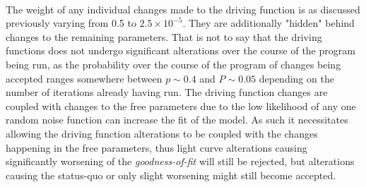 \documentclass[a4paper, 12pt, twoside]{article}
\begin{document}
\\
The weight of any individual changes made to the driving function is as discussed previously varying from 0.5 to $2.5 \times 10^{-5}$. They are additionally "hidden" behind changes to the remaining parameters. That is not to say that the driving functions does not undergo significant alterations over the course of the program being run, as the probability over the course of the program of changes being accepted ranges somewhere between $p\sim 0.4$ and $P\sim 0.05$ depending on the number of iterations already having run. The driving function changes are coupled with changes to the free parameters due to the low likelihood of any one random noise function can increase the fit of the model. As such it necessitates allowing the driving function alterations to be coupled with the changes happening in the free parameters, thus light curve alterations causing significantly worsening of the \emph{goodness-of-fit} will still be rejected, but alterations causing the status-quo or only slight worsening might still become accepted. 






\end{document}
